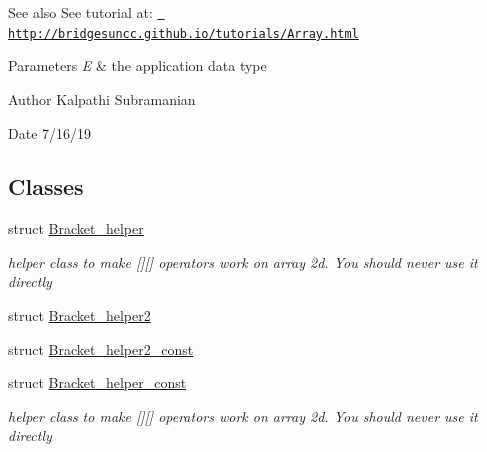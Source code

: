\begin{DoxyCode}{0}
\end{DoxyCode}


\begin{DoxySeeAlso}{See also}
See tutorial at\+: \href{http://bridgesuncc.github.io/tutorials/Array.html}{\texttt{ http\+://bridgesuncc.\+github.\+io/tutorials/\+Array.\+html}}
\end{DoxySeeAlso}

\begin{DoxyParams}{Parameters}
{\em E} & the application data type\\
\hline
\end{DoxyParams}
\begin{DoxyAuthor}{Author}
Kalpathi Subramanian 
\end{DoxyAuthor}
\begin{DoxyDate}{Date}
7/16/19 
\end{DoxyDate}
\subsection*{Classes}
\begin{DoxyCompactItemize}
\item 
struct \mbox{\hyperlink{structbridges_1_1datastructure_1_1_array3_d_1_1_bracket__helper}{Bracket\+\_\+helper}}
\begin{DoxyCompactList}\small\item\em helper class to make \mbox{[}\mbox{]}\mbox{[}\mbox{]} operators work on array 2d. You should never use it directly \end{DoxyCompactList}\item 
struct \mbox{\hyperlink{structbridges_1_1datastructure_1_1_array3_d_1_1_bracket__helper2}{Bracket\+\_\+helper2}}
\item 
struct \mbox{\hyperlink{structbridges_1_1datastructure_1_1_array3_d_1_1_bracket__helper2__const}{Bracket\+\_\+helper2\+\_\+const}}
\item 
struct \mbox{\hyperlink{structbridges_1_1datastructure_1_1_array3_d_1_1_bracket__helper__const}{Bracket\+\_\+helper\+\_\+const}}
\begin{DoxyCompactList}\small\item\em helper class to make \mbox{[}\mbox{]}\mbox{[}\mbox{]} operators work on array 2d. You should never use it directly \end{DoxyCompactList}\end{DoxyCompactItemize}
